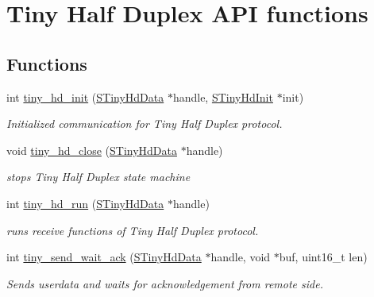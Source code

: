 \hypertarget{group__HALF__DUPLEX__API}{}\section{Tiny Half Duplex A\+P\+I functions}
\label{group__HALF__DUPLEX__API}
\subsection*{Functions}
\begin{DoxyCompactItemize}
\item 
int \hyperlink{group__HALF__DUPLEX__API_ga747e6a3a0b5d2a9e1fe0c143c20057e9}{tiny\+\_\+hd\+\_\+init} (\hyperlink{tiny__hd_8h_af9f81ad129b754a780dfca5dcd7f7cf9}{S\+Tiny\+Hd\+Data} $\ast$handle, \hyperlink{tiny__hd_8h_a784f1a0f0ae7f06da4bc288fa3f22408}{S\+Tiny\+Hd\+Init} $\ast$init)
\begin{DoxyCompactList}\small\item\em Initialized communication for Tiny Half Duplex protocol. \end{DoxyCompactList}\item 
void \hyperlink{group__HALF__DUPLEX__API_ga275846730a88b9654345d5defbda31e7}{tiny\+\_\+hd\+\_\+close} (\hyperlink{tiny__hd_8h_af9f81ad129b754a780dfca5dcd7f7cf9}{S\+Tiny\+Hd\+Data} $\ast$handle)
\begin{DoxyCompactList}\small\item\em stops Tiny Half Duplex state machine \end{DoxyCompactList}\item 
int \hyperlink{group__HALF__DUPLEX__API_gac962595f09883dea1dd0992a608a17b9}{tiny\+\_\+hd\+\_\+run} (\hyperlink{tiny__hd_8h_af9f81ad129b754a780dfca5dcd7f7cf9}{S\+Tiny\+Hd\+Data} $\ast$handle)
\begin{DoxyCompactList}\small\item\em runs receive functions of Tiny Half Duplex protocol. \end{DoxyCompactList}\item 
int \hyperlink{group__HALF__DUPLEX__API_ga5aad8dcb504b80bac923496f2686a6d6}{tiny\+\_\+send\+\_\+wait\+\_\+ack} (\hyperlink{tiny__hd_8h_af9f81ad129b754a780dfca5dcd7f7cf9}{S\+Tiny\+Hd\+Data} $\ast$handle, void $\ast$buf, uint16\+\_\+t len)
\begin{DoxyCompactList}\small\item\em Sends userdata and waits for acknowledgement from remote side. \end{DoxyCompactList}\end{DoxyCompactItemize}


